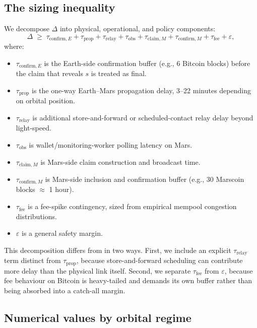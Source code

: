 \documentclass[11pt]{article}
\begin{document}
\subsection{The sizing inequality}

We decompose $\Delta$ into physical, operational, and policy components:
\begin{equation}
\Delta \;\geq\; \tau_{\text{confirm},E} + \tau_{\text{prop}} + \tau_{\text{relay}} + \tau_{\text{obs}} + \tau_{\text{claim},M} + \tau_{\text{confirm},M} + \tau_{\text{fee}} + \varepsilon,
\label{eq:sizing}
\end{equation}
where:
\begin{itemize}
  \item $\tau_{\text{confirm},E}$ is the Earth-side confirmation buffer (e.g., 6 Bitcoin blocks) before the claim that reveals $s$ is treated as final.
  \item $\tau_{\text{prop}}$ is the one-way Earth--Mars propagation delay, 3--22 minutes depending on orbital position.
  \item $\tau_{\text{relay}}$ is additional store-and-forward or scheduled-contact relay delay beyond light-speed.
  \item $\tau_{\text{obs}}$ is wallet/monitoring-worker polling latency on Mars.
  \item $\tau_{\text{claim},M}$ is Mars-side claim construction and broadcast time.
  \item $\tau_{\text{confirm},M}$ is Mars-side inclusion and confirmation buffer (e.g., 30 Marscoin blocks $\approx$ 1 hour).
  \item $\tau_{\text{fee}}$ is a fee-spike contingency, sized from empirical mempool congestion distributions.
  \item $\varepsilon$ is a general safety margin.
\end{itemize}

This decomposition differs from \citet{puente2025} in two ways. First, we include an explicit $\tau_{\text{relay}}$ term distinct from $\tau_{\text{prop}}$, because store-and-forward scheduling can contribute more delay than the physical link itself. Second, we separate $\tau_{\text{fee}}$ from $\varepsilon$, because fee behaviour on Bitcoin is heavy-tailed and demands its own buffer rather than being absorbed into a catch-all margin.

\subsection{Numerical values by orbital regime}
\end{document}
